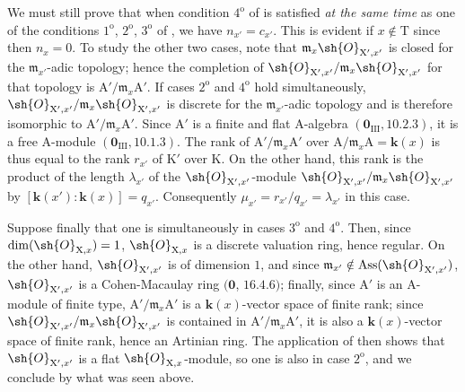 \begin{env}[21.10.11]
\label{IV.21.10.11}
We must still prove that when condition $4^{\mathrm{o}}$ of  is satisfied \emph{at the same time} as one of the conditions $1^{\mathrm{o}}$, $2^{\mathrm{o}}$, $3^{\mathrm{o}}$ of , we have $n_{x'}=c_{x'}$.
This is evident if $x\notin\mathrm{T}$ since then $n_x=0$.
To study the other two cases, note that $\mathfrak{m}_x\sh{O}_{\mathrm{X}',x'}$ is closed for the $\mathfrak{m}_{x'}$-adic topology; hence the completion of $\sh{O}_{\mathrm{X}',x'}/\mathfrak{m}_x\sh{O}_{\mathrm{X}',x'}$ for that topology is $\mathrm{A}'/\mathfrak{m}_x\mathrm{A}'$.
If cases $2^{\mathrm{o}}$ and $4^{\mathrm{o}}$ hold simultaneously, $\sh{O}_{\mathrm{X}',x'}/\mathfrak{m}_x\sh{O}_{\mathrm{X}',x'}$ is discrete for the $\mathfrak{m}_{x'}$-adic topology and is therefore isomorphic to $\mathrm{A}'/\mathfrak{m}_x\mathrm{A}'$.
Since $\mathrm{A}'$ is a finite and flat $\mathrm{A}$-algebra $(\mathbf{0}_{\mathrm{III}},10.2.3)$, it is a free $\mathrm{A}$-module $(\mathbf{0}_{\mathrm{III}},10.1.3)$.
The rank of $\mathrm{A}'/\mathfrak{m}_x\mathrm{A}'$ over $\mathrm{A}/\mathfrak{m}_x\mathrm{A}=\boldsymbol{k}(x)$ is thus equal to the rank $r_{x'}$ of $\mathrm{K}'$ over $\mathrm{K}$.
On the other hand, this rank is the product of the length $\lambda_{x'}$ of the $\sh{O}_{\mathrm{X}',x'}$-module $\sh{O}_{\mathrm{X}',x'}/\mathfrak{m}_x\sh{O}_{\mathrm{X}',x'}$ by $[\boldsymbol{k}(x'): \boldsymbol{k}(x)]=q_{x'}$.
Consequently $\mu_{x'}=r_{x'}/q_{x'}=\lambda_{x'}$ in this case.

Suppose finally that one is simultaneously in cases $3^{\mathrm{o}}$ and $4^{\mathrm{o}}$.
Then, since $\dim(\sh{O}_{\mathrm{X},x})=1$, $\sh{O}_{\mathrm{X},x}$ is a discrete valuation ring, hence regular.
On the other hand, $\sh{O}_{\mathrm{X}',x'}$ is of dimension $1$, and since $\mathfrak{m}_{x'}\notin\operatorname{Ass}(\sh{O}_{\mathrm{X}',x'})$, $\sh{O}_{\mathrm{X}',x'}$ is a Cohen-Macaulay ring $(\mathbf{0}$, $16.4.6)$; finally, since $\mathrm{A}'$ is an A-module of finite type, $\mathrm{A}'/\mathfrak{m}_x\mathrm{A}'$ is a $\boldsymbol{k}(x)$-vector space of finite rank; since $\sh{O}_{\mathrm{X}',x'}/\mathfrak{m}_x\sh{O}_{\mathrm{X}',x'}$ is contained in $\mathrm{A}'/\mathfrak{m}_x\mathrm{A}'$, it is also a $\boldsymbol{k}(x)$-vector space of finite rank, hence an Artinian ring.
The application of  then shows that $\sh{O}_{\mathrm{X}',x'}$ is a flat $\sh{O}_{\mathrm{X},x}$-module, so one is also in case $2^{\mathrm{o}}$, and we conclude by what was seen above.


\end{env}

